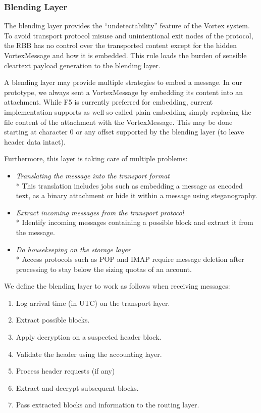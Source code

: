 \documentclass[10pt,journal,compsoc,twocolumn,twoside]{IEEEtran}
\begin{document}
\subsubsection{Blending Layer}
The blending layer provides the ``undetectability'' feature of the Vortex system. To avoid transport protocol misuse and unintentional exit nodes of the protocol, the RBB has no control over the transported content except for the hidden VortexMessage and how it is embedded. This rule loads the burden of sensible cleartext payload generation to the blending layer. 

A blending layer may provide multiple strategies to embed a message. In our prototype, we always sent a VortexMessage by embedding its content into an attachment. While F5\cite{f5} is currently preferred for embedding, current implementation supports as well so-called plain embedding simply replacing the file content of the attachment with the VortexMessage. This may be done starting at character 0 or any offset supported by the blending layer (to leave header data intact).

Furthermore, this layer is taking care of multiple problems:
\begin{itemize}
	\item \emph{Translating the message into the transport format}\\*
	This translation includes jobs such as embedding a message as encoded text, as a binary attachment or hide it within a message using steganography.
	\item \emph{Extract incoming messages from the transport protocol}\\*
	Identify incoming messages containing a possible block and extract it from the message.
	\item \emph{Do housekeeping on the storage layer}\\*
	Access protocols such as POP and IMAP require message deletion after processing to stay below the sizing quotas of an account.         
\end{itemize}

We define the blending layer to work as follows when receiving messages:
\begin{enumerate}
	\item Log arrival time (in UTC) on the transport layer.
	\item Extract possible blocks.
	\item Apply decryption on a suspected header block.
	\item Validate the header using the accounting layer.
	\item Process header requests (if any)
	\item Extract and decrypt subsequent blocks.
	\item Pass extracted blocks and information to the routing layer.
\end{enumerate}
\end{document}
